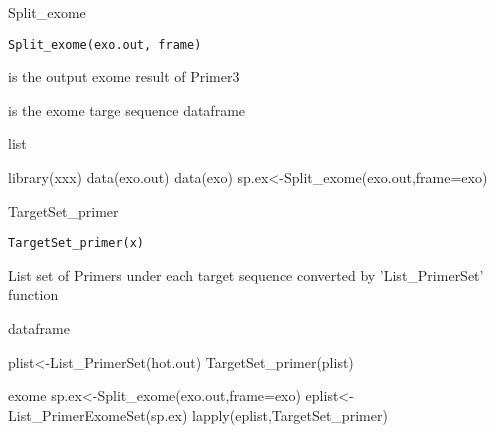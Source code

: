 \documentclass[a4paper]{book}
\begin{document}
%
\begin{Description}\relax
Split\_exome
\end{Description}
%
\begin{Usage}
\begin{verbatim}
Split_exome(exo.out, frame)
\end{verbatim}
\end{Usage}
%
\begin{Arguments}
\begin{ldescription}
\item[\code{exo.out}] is the output exome result of Primer3

\item[\code{frame}] is the exome targe sequence dataframe
\end{ldescription}
\end{Arguments}
%
\begin{Value}
list
\end{Value}
%
\begin{Examples}
\begin{ExampleCode}
library(xxx)
data(exo.out)
data(exo)
sp.ex<-Split_exome(exo.out,frame=exo)
\end{ExampleCode}
\end{Examples}
%
\begin{Description}\relax
TargetSet\_primer
\end{Description}
%
\begin{Usage}
\begin{verbatim}
TargetSet_primer(x)
\end{verbatim}
\end{Usage}
%
\begin{Arguments}
\begin{ldescription}
\item[\code{x}] List set of Primers under each target sequence converted by 'List\_PrimerSet' function
\end{ldescription}
\end{Arguments}
%
\begin{Value}
dataframe
\end{Value}
%
\begin{Examples}
\begin{ExampleCode}
plist<-List_PrimerSet(hot.out)
TargetSet_primer(plist)

exome
sp.ex<-Split_exome(exo.out,frame=exo)
eplist<-List_PrimerExomeSet(sp.ex)
lapply(eplist,TargetSet_primer) %
\end{ExampleCode}
\end{Examples}
\end{document}
